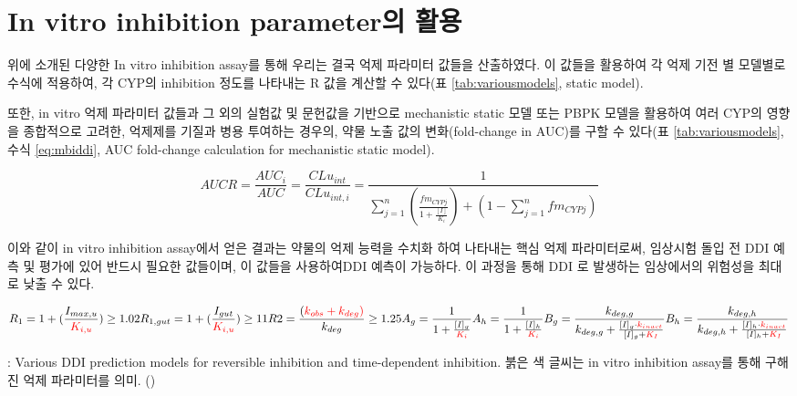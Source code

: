 \documentclass[
  11pt,
  krantz2, a4paper, twoside]{krantz}
\begin{document}
\section{In vitro inhibition parameter의 활용}\label{in-vitro-inhibition-parameteruxc758-uxd65cuxc6a9}

위에 소개된 다양한 In vitro inhibition assay를 통해 우리는 결국 억제
파라미터 값들을 산출하였다. 이 값들을 활용하여 각 억제 기전 별 모델별로
수식에 적용하여, 각 CYP의 inhibition 정도를 나타내는 R 값을 계산할 수
있다(표 \ref{tab:variousmodels}, static model).

또한, in vitro 억제 파라미터 값들과 그 외의 실험값 및 문헌값을 기반으로
mechanistic static 모델 또는 PBPK 모델을 활용하여 여러 CYP의 영향을
종합적으로 고려한, 억제제를 기질과 병용 투여하는 경우의, 약물 노출 값의
변화(fold-change in AUC)를 구할 수 있다(표 \ref{tab:variousmodels},
수식 \eqref{eq:mbiddi}, AUC fold-change calculation for mechanistic
static model).

\begin{equation}
AUCR = \frac{AUC_i}{AUC} = \frac{CLu_{int}}{CLu_{int,i}} = 
\frac{1}{\sum_{j=1}^{n} (\frac{fm_{CYPj}}{1+\frac{[I]}{K_i}}) 
+ (1-\sum_{j=1}^{n}fm_{CYPj})}
\label{eq:mbiddi} 
\end{equation}

이와 같이 in vitro inhibition assay에서 얻은 결과는 약물의 억제 능력을
수치화 하여 나타내는 핵심 억제 파라미터로써, 임상시험 돌입 전 DDI 예측
및 평가에 있어 반드시 필요한 값들이며, 이 값들을 사용하여DDI 예측이
가능하다. 이 과정을 통해 DDI 로 발생하는 임상에서의 위험성을 최대로 낮출
수 있다.

\[
R_{1} = 1 + (\frac{I_{max,u}}{\color{red}{K_{i,u}}})\geq1.02 \\ R_{1,gut} = 1+(\frac{I_{gut}}{\color{red}{K_{i,u}}}) \geq11 \\
R2 = \frac{(\color{red}{k_{obs}}+k_{deg})}{k_{deg}}\geq1.25 \\
A_{g} = \frac{1}{1+\frac{[I]_{g}}{\color{red}{K_{i}}}} \\ A_{h} = \frac{1}{1+\frac{[I]_{h}}{\color{red}{K_{i}}}} \\
B_{g} = \frac{k_{deg,g}}{k_{deg,g} + \frac{[I]_g\cdot \color{red}{k_{inact}}}{[I]_{g}+\color{red}{K_{I}}}} \\ B_{h} = \frac{k_{deg,h}}{k_{deg,h} + \frac{[I]_h\cdot \color{red}{k_{inact}}}{[I]_{h}+\color{red}{K_{I}}}}
\]

: \label{tab:variousmodels} Various DDI prediction models for reversible
inhibition and time-dependent inhibition. 붉은 색 글씨는 in vitro
inhibition assay를 통해 구해진 억제 파라미터를 의미. ()
\end{document}

